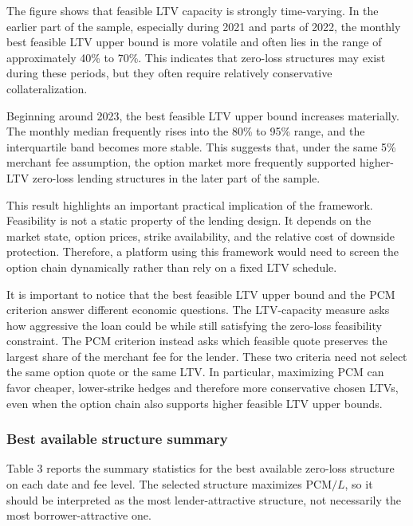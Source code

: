 \documentclass[11pt]{article}
\begin{document}
The figure shows that feasible LTV capacity is strongly time-varying. In the earlier part of the sample, especially during 2021 and parts of 2022, the monthly best feasible LTV upper bound is more volatile and often lies in the range of approximately 40\% to 70\%. This indicates that zero-loss structures may exist during these periods, but they often require relatively conservative collateralization.

Beginning around 2023, the best feasible LTV upper bound increases materially. The monthly median frequently rises into the 80\% to 95\% range, and the interquartile band becomes more stable. This suggests that, under the same 5\% merchant fee assumption, the option market more frequently supported higher-LTV zero-loss lending structures in the later part of the sample.

This result highlights an important practical implication of the framework. Feasibility is not a static property of the lending design. It depends on the market state, option prices, strike availability, and the relative cost of downside protection. Therefore, a platform using this framework would need to screen the option chain dynamically rather than rely on a fixed LTV schedule.

It is important to notice that the best feasible LTV upper bound and the PCM criterion answer different economic questions. The LTV-capacity measure asks how aggressive the loan could be while still satisfying the zero-loss feasibility constraint. The PCM criterion instead asks which feasible quote preserves the largest share of the merchant fee for the lender. These two criteria need not select the same option quote or the same LTV. In particular, maximizing PCM can favor cheaper, lower-strike hedges and therefore more conservative chosen LTVs, even when the option chain also supports higher feasible LTV upper bounds.

\subsubsection{Best available structure summary}

Table 3 reports the summary statistics for the best available zero-loss structure on each date and fee level. The selected structure maximizes $\text{PCM}/L$, so it should be interpreted as the most lender-attractive structure, not necessarily the most borrower-attractive one.
\end{document}
